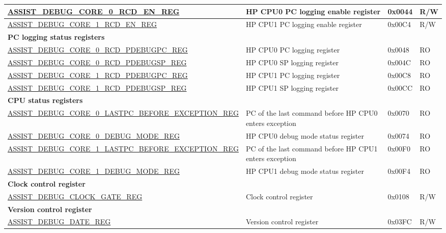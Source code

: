 \begin{longtable}{ | p{8.7cm} | m{5.3cm} | p{1.2cm} | p{1.2cm} | }
\hyperref[regdesc:ASSISTDEBUGCORE0RCDENREG]{ASSIST\_DEBUG\_CORE\_0\_RCD\_EN\_REG} & HP CPU0 PC logging enable register & 0x0044 &R/W \\ \hline
\hyperref[regdesc:ASSISTDEBUGCORE1RCDENREG]{ASSIST\_DEBUG\_CORE\_1\_RCD\_EN\_REG} & HP CPU1 PC logging enable register & 0x00C4 &R/W \\ \hline
\multicolumn{4}{|l|}{\textbf{PC logging status registers}} \\ \hline
\hyperref[regdesc:ASSISTDEBUGCORE0RCDPDEBUGPCREG]{ASSIST\_DEBUG\_CORE\_0\_RCD\_PDEBUGPC\_REG} & HP CPU0 PC logging register & 0x0048 & RO \\ \hline
\hyperref[regdesc:ASSISTDEBUGCORE0RCDPDEBUGSPREG]{ASSIST\_DEBUG\_CORE\_0\_RCD\_PDEBUGSP\_REG} & HP CPU0 SP logging register & 0x004C & RO \\ \hline
\hyperref[regdesc:ASSISTDEBUGCORE1RCDPDEBUGPCREG]{ASSIST\_DEBUG\_CORE\_1\_RCD\_PDEBUGPC\_REG} & HP CPU1 PC logging register & 0x00C8 & RO \\ \hline
\hyperref[regdesc:ASSISTDEBUGCORE1RCDPDEBUGSPREG]{ASSIST\_DEBUG\_CORE\_1\_RCD\_PDEBUGSP\_REG} & HP CPU1 SP logging register & 0x00CC & RO \\ \hline
\multicolumn{4}{|l|}{\textbf{CPU status registers}} \\ \hline
\hyperref[regdesc:ASSISTDEBUGCORE0LASTPCBEFOREEXCEPTIONREG]{ASSIST\_DEBUG\_CORE\_0\_LASTPC\_BEFORE\_\newline EXCEPTION\_REG} & PC of the last command before HP CPU0 enters exception & 0x0070 & RO \\ \hline
\hyperref[regdesc:ASSISTDEBUGCORE0DEBUGMODEREG]{ASSIST\_DEBUG\_CORE\_0\_DEBUG\_MODE\_REG} & HP CPU0 debug mode status register & 0x0074 & RO \\ \hline
\hyperref[regdesc:ASSISTDEBUGCORE1LASTPCBEFOREEXCEPTIONREG]{ASSIST\_DEBUG\_CORE\_1\_LASTPC\_BEFORE\_\newline EXCEPTION\_REG} & PC of the last command before HP CPU1 enters exception & 0x00F0 & RO \\ \hline
\hyperref[regdesc:ASSISTDEBUGCORE1DEBUGMODEREG]{ASSIST\_DEBUG\_CORE\_1\_DEBUG\_MODE\_REG} & HP CPU1 debug mode status register & 0x00F4 & RO \\ \hline
\multicolumn{4}{|l|}{\textbf{Clock control register}} \\ \hline
\hyperref[regdesc:ASSISTDEBUGCLOCKGATEREG]{ASSIST\_DEBUG\_CLOCK\_GATE\_REG} & Clock control register  & 0x0108 & R/W \\ \hline
\multicolumn{4}{|l|}{\textbf{Version control register}} \\ \hline
\hyperref[regdesc:ASSISTDEBUGDATEREG]{ASSIST\_DEBUG\_DATE\_REG} & Version control register & 0x03FC & R/W \\ \hline
\end{longtable}
